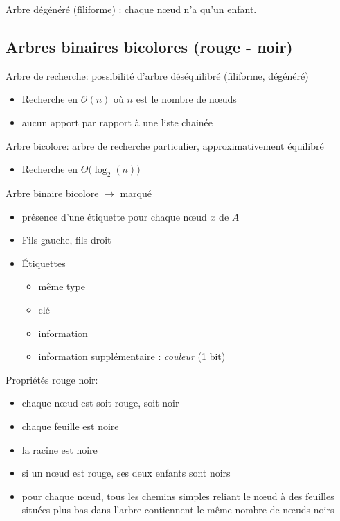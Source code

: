 Arbre dégénéré (filiforme) : chaque nœud n'a qu'un enfant.

\hypertarget{arbres-binaires-bicolores-rouge---noir}{%
\subsection{Arbres binaires bicolores (rouge -
noir)}\label{arbres-binaires-bicolores-rouge---noir}}

Arbre de recherche: possibilité d'arbre déséquilibré (filiforme,
dégénéré)

\begin{itemize}
\tightlist
\item
  Recherche en \(\mathcal{O}(n)\) où \(n\) est le nombre de nœuds
\item
  aucun apport par rapport à une liste chainée
\end{itemize}

Arbre bicolore: arbre de recherche particulier, approximativement
équilibré

\begin{itemize}
\tightlist
\item
  Recherche en \(\Theta\big(\log_2(n)\big)\)
\end{itemize}

Arbre binaire bicolore \(\to\) marqué

\begin{itemize}
\tightlist
\item
  présence d'une étiquette pour chaque nœud \(x\) de \(A\)
\item
  Fils gauche, fils droit
\item
  Étiquettes

  \begin{itemize}
  \tightlist
  \item
    même type
  \item
    clé
  \item
    information
  \item
    information supplémentaire : \emph{couleur} (1 bit)
  \end{itemize}
\end{itemize}

Propriétés rouge noir:

\begin{itemize}
\tightlist
\item
  chaque nœud est soit rouge, soit noir
\item
  chaque feuille est noire
\item
  la racine est noire
\item
  si un nœud est rouge, ses deux enfants sont noirs
\item
  pour chaque nœud, tous les chemins simples reliant le nœud à des
  feuilles situées plus bas dans l'arbre contiennent le même nombre de
  nœuds noirs
\end{itemize}

